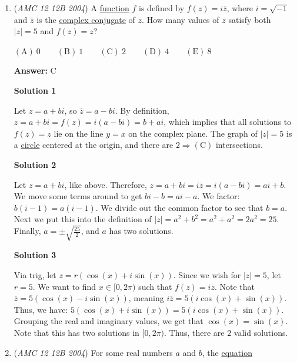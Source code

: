 \begin{enumerate}
	\item (\textit{AMC 12 12B 2004}) A \href{https://artofproblemsolving.com/wiki/index.php?title=Function}{function} $f$ is defined by $f(z) = i\overline{z}$, where $i=\sqrt{-1}$ and $\overline{z}$ is the \href{https://artofproblemsolving.com/wiki/index.php?title=Complex\_conjugate}{complex conjugate} of $z$. How many values of $z$ satisfy both $|z| = 5$ and $f(z) = z$?


 $\mathrm{(A)}\ 0 \qquad\mathrm{(B)}\ 1 \qquad\mathrm{(C)}\ 2  \qquad\mathrm{(D)}\ 4 \qquad\mathrm{(E)}\ 8$

 \textbf{Answer: }C



\textbf{Solution 1}

Let $z = a+bi$, so $\overline{z} = a-bi$. By definition, $z = a+bi = f(z) = i(a-bi) = b+ai$, which implies that all solutions to $f(z) = z$ lie on the line $y=x$ on the complex plane. The graph of $|z| = 5$ is a \href{https://artofproblemsolving.com/wiki/index.php?title=Circle}{circle} centered at the origin, and there are $2 \Rightarrow \mathrm{(C)}$ intersections.

 



\textbf{Solution 2}

Let $z=a+bi$, like above. Therefore, $z = a+bi = i\overline{z} = i(a-bi) = ai+b$. We move some terms around to get $bi-b = ai-a$. We factor: $b(i-1) = a(i-1)$. We divide out the common factor to see that $b = a$. Next we put this into the definition of $|z| = a^2 + b^2 = a^2 + a^2 = 2a^2 = 25$. Finally, $a = \pm\sqrt{\frac{25}{2}}$, and $a$ has two solutions.

 



\textbf{Solution 3}

Via trig, let $z=r(\cos(x)+i\sin(x))$. Since we wish for $|z|=5$, let $r=5$. We want to find $x\in [0, 2\pi)$ such that $f(z)=i\overline{z}$. Note that $\overline{z}=5(\cos(x)-i\sin(x))$, meaning $i\overline{z}=5(i\cos(x)+\sin(x))$. Thus, we have: $5(\cos(x)+i\sin(x))=5(i\cos(x)+\sin(x))$. Grouping the real and imaginary values, we get that $\cos(x)=\sin(x)$. Note that this has two solutions in $[0, 2\pi)$. Thus, there are $2$ valid solutions.

 


	\item (\textit{AMC 12 12B 2004}) For some real numbers $a$ and $b$, the \href{https://artofproblemsolving.com/wiki/index.php?title=Equation}{equation}


\end{enumerate}
